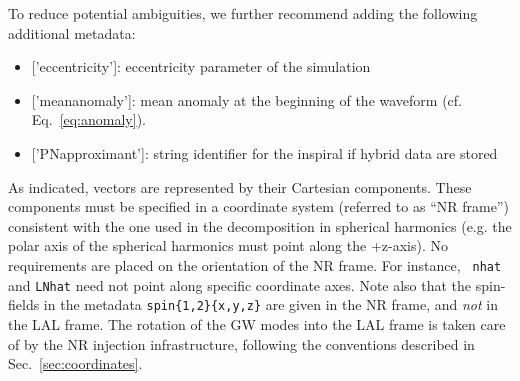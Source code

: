 \documentclass[11pt,tightenlines,article,amssymb,amsmath,amsfonts,superscriptaddress]{revtex4}
\begin{document}
To reduce potential ambiguities, we further recommend adding the following  additional metadata:
\begin{itemize}
\item{[}'eccentricity'{]}: eccentricity parameter of the simulation
\item {[}'mean\textunderscore anomaly'{]}: mean anomaly at the beginning of the waveform (cf. Eq.~\ref{eq:anomaly}).
\item{[}'PN\textunderscore approximant'{]}: string identifier for the inspiral if hybrid data are stored
\end{itemize}

As indicated, vectors are represented by their Cartesian components.
  These components must be specified in a coordinate system (referred
  to as ``NR frame'') consistent with the one used in the
decomposition in spherical harmonics (e.g. the polar axis of the
spherical harmonics must point along the +z-axis).  No requirements
are placed on the orientation of the NR frame. For instance, {\tt
  nhat} and {\tt LNhat} need not point along specific coordinate axes.
Note also that the spin-fields in the metadata
\texttt{spin\{1,2\}\{x,y,z\}} are given in the NR frame, and
\emph{not} in the LAL frame.  The rotation of the GW modes into the
LAL frame is taken care of by the NR injection infrastructure,
following the conventions described in Sec.~\ref{sec:coordinates}.



\end{document}
